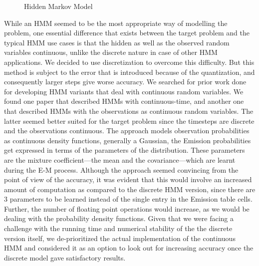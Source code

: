 \documentclass[twoside]{article}
\begin{document}
\begin{figure}[h]
  \centering
  \caption{Hidden Markov Model}\label{fig:hmm}
\end{figure}

While an HMM seemed to be the most appropriate way of modelling the problem, one essential difference that exists between the target problem and the typical HMM use cases is that the hidden as well as the observed random variables continuous, unlike the discrete nature in case of other HMM applications.
We decided to use discretization to overcome this difficulty.
But this method is subject to the error that is introduced because of the quantization, and consequently larger steps give worse accuracy.
We searched for prior work done for developing HMM variants that deal with continuous random variables.
We found one paper that described HMMs with continuous-time, and another one that described HMMs with the observations as continuous random variables.
The latter seemed better suited for the target problem since the timesteps are discrete and the observations continuous.
The approach models observation probabilities as continuous density functions, generally a Gaussian, the Emission probabilities get expressed in terms of the parameters of the distribution.
These parameters are the mixture coefficient---the mean and the covariance---which are learnt during the E-M process.
Although the approach seemed convincing from the point of view of the accuracy, it was evident that this would involve an increased amount of computation as compared to the discrete HMM version, since there are 3 parameters to be learned instead of the single entry in the Emission table cells.
Further, the number of floating point operations would increase, as we would be dealing with the probability density functions.
Given that we were facing a challenge with the running time and numerical stability of the the discrete version itself, we de-prioritized the actual implementation of the continuous HMM and considered it as an option to look out for increasing accuracy once the discrete model gave satisfactory results.
\end{document}
